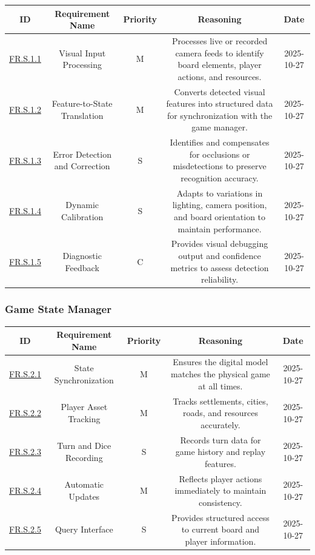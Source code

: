 \documentclass{article}
\begin{document}
\begin{tabular}{|c|c|c|c|c|}
\hline
\textbf{ID} & \textbf{Requirement Name} & \textbf{Priority} &
\textbf{Reasoning} & \textbf{Date} \\
\hline
\hyperref[FR.S.1.1]{FR.S.1.1} & Visual Input Processing & M &
\parbox[t]{4cm}{Processes live or recorded camera feeds to identify board elements, player actions, and resources.} &
2025-10-27 \\
\hline
\hyperref[FR.S.1.2]{FR.S.1.2} & Feature-to-State Translation & M &
\parbox[t]{4cm}{Converts detected visual features into structured \GameState{} data for synchronization with the game manager.} &
2025-10-27 \\
\hline
\hyperref[FR.S.1.3]{FR.S.1.3} & Error Detection and Correction & S &
\parbox[t]{4cm}{Identifies and compensates for occlusions or misdetections to preserve recognition accuracy.} &
2025-10-27 \\
\hline
\hyperref[FR.S.1.4]{FR.S.1.4} & Dynamic Calibration & S &
\parbox[t]{4cm}{Adapts to variations in lighting, camera position, and board orientation to maintain performance.} &
2025-10-27 \\
\hline
\hyperref[FR.S.1.5]{FR.S.1.5} & Diagnostic Feedback & C &
\parbox[t]{4cm}{Provides visual debugging output and confidence metrics to assess detection reliability.} &
2025-10-27 \\
\hline
\end{tabular}

\vspace{1em}


\subsubsection*{Game State Manager}

\begin{tabular}{|c|c|c|c|c|}
\hline
\textbf{ID} & \textbf{Requirement Name} & \textbf{Priority} &
\textbf{Reasoning} & \textbf{Date} \\
\hline
\hyperref[FR.S.2.1]{FR.S.2.1} & State Synchronization & M &
\parbox[t]{4cm}{Ensures the digital model matches the physical game
at all times.} &
2025-10-27 \\
\hline
\hyperref[FR.S.2.2]{FR.S.2.2} & Player Asset Tracking & M &
\parbox[t]{4cm}{Tracks settlements, cities, roads, and resources
accurately.} &
2025-10-27 \\
\hline
\hyperref[FR.S.2.3]{FR.S.2.3} & Turn and Dice Recording & S &
\parbox[t]{4cm}{Records turn data for game history and replay
features.} &
2025-10-27 \\
\hline
\hyperref[FR.S.2.4]{FR.S.2.4} & Automatic Updates & M &
\parbox[t]{4cm}{Reflects player actions immediately to maintain
consistency.} &
2025-10-27 \\
\hline
\hyperref[FR.S.2.5]{FR.S.2.5} & Query Interface & S &
\parbox[t]{4cm}{Provides structured access to current board and
player information.} &
2025-10-27 \\
\hline
\end{tabular}
\end{document}
